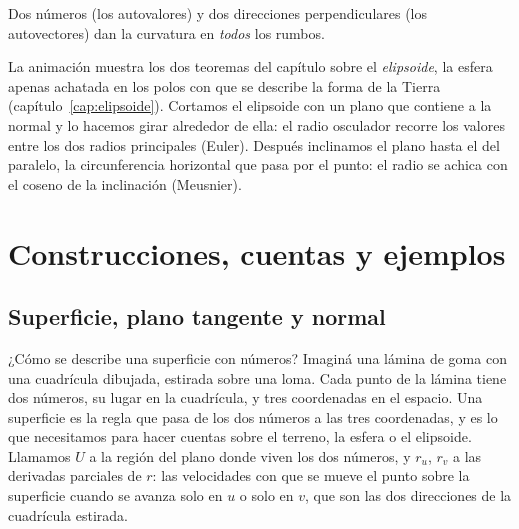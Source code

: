 \begin{idea}
Dos números (los autovalores) y dos direcciones perpendiculares (los autovectores) dan la
curvatura en \emph{todos} los rumbos.
\end{idea}


{\small\vspace{1mm}\par}

La animación muestra los dos teoremas del capítulo sobre el \emph{elipsoide}, la esfera apenas
achatada en los polos con que se describe la forma de la Tierra
(capítulo~\ref{cap:elipsoide}). Cortamos el elipsoide con un plano que contiene a la normal
y lo hacemos girar alrededor de ella: el radio osculador recorre los valores entre los dos
radios principales (Euler). Después inclinamos el plano hasta el del paralelo, la circunferencia
horizontal que pasa por el punto: el radio se achica con el coseno de la inclinación
(Meusnier).

\section{Construcciones, cuentas y ejemplos}

\subsection{Superficie, plano tangente y normal}

¿Cómo se describe una superficie con números? Imaginá una lámina de goma con una cuadrícula
dibujada, estirada sobre una loma. Cada punto de la lámina tiene dos números, su lugar en la
cuadrícula, y tres coordenadas en el espacio. Una superficie es la regla que pasa de los dos
números a las tres coordenadas, y es lo que necesitamos para hacer cuentas sobre el terreno, la
esfera o el elipsoide. Llamamos \(U\) a la región del plano donde viven los dos números, y
\(r_u\), \(r_v\) a las derivadas parciales de \(r\): las velocidades con que se mueve el punto
sobre la superficie cuando se avanza solo en \(u\) o solo en \(v\), que son las dos direcciones
de la cuadrícula estirada.

